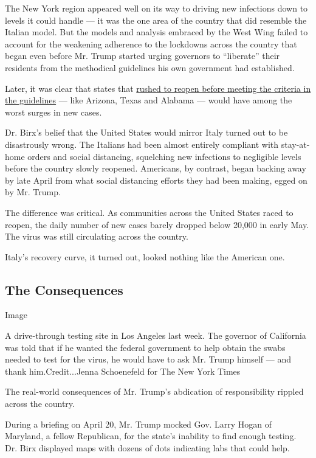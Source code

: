 The New York region appeared well on its way to driving new infections
down to levels it could handle --- it was the one area of the country
that did resemble the Italian model. But the models and analysis
embraced by the West Wing failed to account for the weakening adherence
to the lockdowns across the country that began even before Mr. Trump
started urging governors to ``liberate'' their residents from the
methodical guidelines his own government had established.

Later, it was clear that states that
\href{https://www.nytimes3xbfgragh.onion/interactive/2020/05/07/us/coronavirus-states-reopen-criteria.html}{rushed
to reopen before meeting the criteria in the guidelines} --- like
Arizona, Texas and Alabama --- would have among the worst surges in new
cases.

Dr. Birx's belief that the United States would mirror Italy turned out
to be disastrously wrong. The Italians had been almost entirely
compliant with stay-at-home orders and social distancing, squelching new
infections to negligible levels before the country slowly reopened.
Americans, by contrast, began backing away by late April from what
social distancing efforts they had been making, egged on by Mr. Trump.

The difference was critical. As communities across the United States
raced to reopen, the daily number of new cases barely dropped below
20,000 in early May. The virus was still circulating across the country.

Italy's recovery curve, it turned out, looked nothing like the American
one.

\hypertarget{the-consequences}{%
\subsection{The Consequences}\label{the-consequences}}

Image

A drive-through testing site in Los Angeles last week. The governor of
California was told that if he wanted the federal government to help
obtain the swabs needed to test for the virus, he would have to ask Mr.
Trump himself --- and thank him.Credit...Jenna Schoenefeld for The New
York Times

The real-world consequences of Mr. Trump's abdication of responsibility
rippled across the country.

During a briefing on April 20, Mr. Trump mocked Gov. Larry Hogan of
Maryland, a fellow Republican, for the state's inability to find enough
testing. Dr. Birx displayed maps with dozens of dots indicating labs
that could help.


